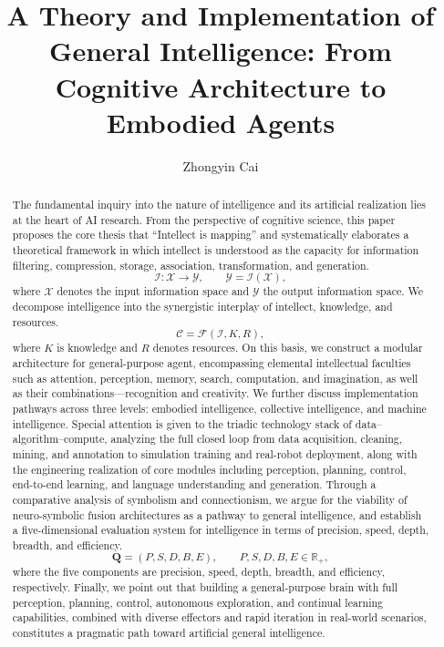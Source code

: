 \documentclass[12pt,a4paper]{article}
\title{A Theory and Implementation of General Intelligence: From Cognitive Architecture to Embodied Agents}
\author{Zhongyin Cai}
\date{}
\newcommand{\Intell}{\mathcal{I}}
\begin{document}
\maketitle

\begin{abstract}
The fundamental inquiry into the nature of intelligence and its artificial realization lies at the heart of AI research. From the perspective of cognitive science, this paper proposes the core thesis that ``Intellect is mapping'' and systematically elaborates a theoretical framework in which intellect is understood as the capacity for information filtering, compression, storage, association, transformation, and generation.
\begin{equation}
\Intell:\mathcal{X}\to\mathcal{Y},\qquad \mathcal{Y}=\Intell(\mathcal{X}),
\label{eq:abstract-mapping}
\end{equation}
where $\mathcal{X}$ denotes the input information space and $\mathcal{Y}$ the output information space. We decompose intelligence into the synergistic interplay of intellect, knowledge, and resources.
\begin{equation}
\mathcal{C}=\mathcal{F}\left(\Intell,K,R\right),
\label{eq:abstract-capability}
\end{equation}
where $K$ is knowledge and $R$ denotes resources. On this basis, we construct a modular architecture for general-purpose agent, encompassing elemental intellectual faculties such as attention, perception, memory, search, computation, and imagination, as well as their combinations---recognition and creativity. We further discuss implementation pathways across three levels: embodied intelligence, collective intelligence, and machine intelligence. Special attention is given to the triadic technology stack of data--algorithm--compute, analyzing the full closed loop from data acquisition, cleaning, mining, and annotation to simulation training and real-robot deployment, along with the engineering realization of core modules including perception, planning, control, end-to-end learning, and language understanding and generation. Through a comparative analysis of symbolism and connectionism, we argue for the viability of neuro-symbolic fusion architectures as a pathway to general intelligence, and establish a five-dimensional evaluation system for intelligence in terms of precision, speed, depth, breadth, and efficiency.
\begin{equation}
\mathbf{Q}=\left(P,S,D,B,E\right),\qquad P,S,D,B,E\in\mathbb{R}_{+},
\label{eq:abstract-five-dim}
\end{equation}
where the five components are precision, speed, depth, breadth, and efficiency, respectively. Finally, we point out that building a general-purpose brain with full perception, planning, control, autonomous exploration, and continual learning capabilities, combined with diverse effectors and rapid iteration in real-world scenarios, constitutes a pragmatic path toward artificial general intelligence.
\end{abstract}
\end{document}
